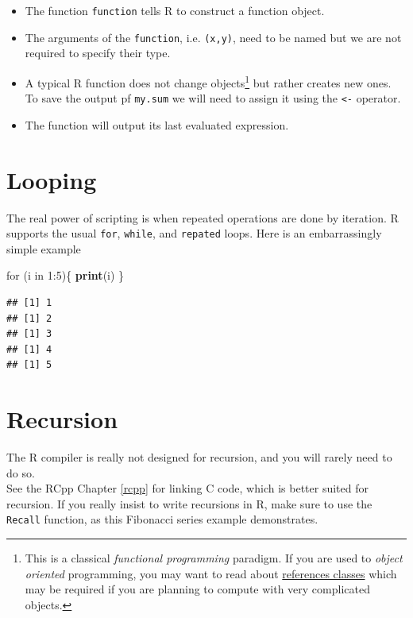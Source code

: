\documentclass[]{book}
\newenvironment{Shaded}{\begin{snugshade}}{\end{snugshade}}
\newcommand{\KeywordTok}[1]{\textcolor[rgb]{0.13,0.29,0.53}{\textbf{{#1}}}}
\newcommand{\DecValTok}[1]{\textcolor[rgb]{0.00,0.00,0.81}{{#1}}}
\newcommand{\NormalTok}[1]{{#1}}
\providecommand{\tightlist}{%
  \setlength{\itemsep}{0pt}\setlength{\parskip}{0pt}}
\theoremstyle{definition}
\theoremstyle{definition}
\theoremstyle{remark}
\begin{document}
\begin{itemize}
\tightlist
\item
  The function \texttt{function} tells R to construct a function object.
\item
  The arguments of the \texttt{function}, i.e. \texttt{(x,y)}, need to
  be named but we are not required to specify their type.
\item
  A typical R function does not change objects\footnote{This is a
    classical \emph{functional programming} paradigm. If you are used to
    \emph{object oriented} programming, you may want to read about
    \href{http://adv-r.had.co.nz/R5.html}{references classes} which may
    be required if you are planning to compute with very complicated
    objects.} but rather creates new ones. To save the output pf
  \texttt{my.sum} we will need to assign it using the
  \texttt{\textless{}-} operator.
\item
  The function will output its last evaluated expression.
\end{itemize}

\section{Looping}\label{looping}

The real power of scripting is when repeated operations are done by
iteration. R supports the usual \texttt{for}, \texttt{while}, and
\texttt{repated} loops. Here is an embarrassingly simple example

\begin{Shaded}
\begin{Highlighting}[]
\NormalTok{for (i in }\DecValTok{1}\NormalTok{:}\DecValTok{5}\NormalTok{)\{}
    \KeywordTok{print}\NormalTok{(i)}
    \NormalTok{\}}
\end{Highlighting}
\end{Shaded}

\begin{verbatim}
## [1] 1
## [1] 2
## [1] 3
## [1] 4
## [1] 5
\end{verbatim}

\section{Recursion}\label{recursion}

The R compiler is really not designed for recursion, and you will rarely
need to do so.\\
See the RCpp Chapter \ref{rcpp} for linking C code, which is better
suited for recursion. If you really insist to write recursions in R,
make sure to use the \texttt{Recall} function, as this Fibonacci series
example demonstrates.
\end{document}
